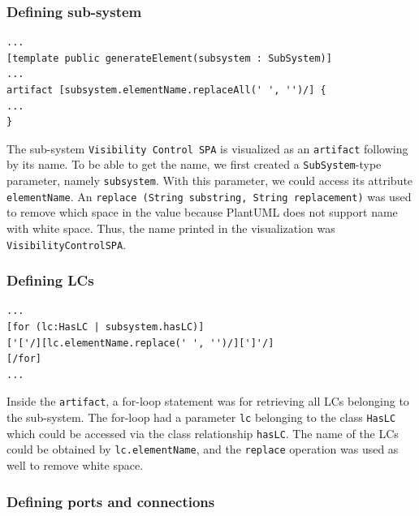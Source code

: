 \subsubsection*{Defining sub-system}
\begin{lstlisting}[caption=Defining \texttt{artifact} for the sub-system,label=code:defining_subsystem]
...
[template public generateElement(subsystem : SubSystem)]
...
artifact [subsystem.elementName.replaceAll(' ', '')/] {
...
}
\end{lstlisting}

The sub-system \texttt{Visibility Control SPA} is visualized as an \texttt{artifact} following by its name. To be able to get the name, we first created a \texttt{SubSystem}-type parameter, namely \texttt{subsystem}. With this parameter, we could access its attribute \texttt{elementName}. An \texttt{replace (String substring, String replacement)} was used to remove which space in the value because PlantUML does not support name with white space. Thus, the name printed in the visualization was \texttt{VisibilityControlSPA}.

\subsubsection*{Defining LCs}

\begin{lstlisting}[caption=Defining \texttt{component} for the LCs,label=code:defining_lc]
...
[for (lc:HasLC | subsystem.hasLC)]
['['/][lc.elementName.replace(' ', '')/][']'/]
[/for]
...
\end{lstlisting}

Inside the \texttt{artifact}, a for-loop statement was for retrieving all LCs belonging to the sub-system. The for-loop had a parameter \texttt{lc} belonging to the class \texttt{HasLC} which could be accessed via the class relationship \texttt{hasLC}. The name of the LCs could be obtained by \texttt{lc.elementName}, and the \texttt{replace} operation was used as well to remove white space.


\subsubsection*{Defining ports and connections}

